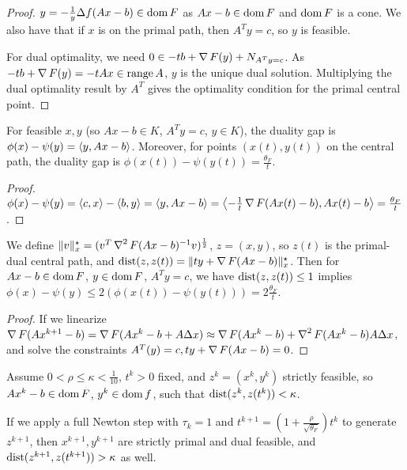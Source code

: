 \begin{proof}
  $y = -\frac{1}{y} \Delta f(Ax - b) \in \operatorname*{dom} F$ as $Ax - b \in \operatorname*{dom}
  F$ and $\operatorname*{dom} F$ is a cone.  We also have that if $x$ is on the primal path,
  then $A^{T} y = c$, so $y$ is feasible.

  For dual optimality, we need $0 \in -tb + \operatorname*{\nabla} F(y) + N_{A^{T} y =
    c}$. As $-tb + \operatorname*{\nabla} F(y) = -tAx \in \operatorname*{range} A$, $y$ is the unique
  dual solution.  Multiplying the dual optimality result by $A^{T}$
  gives the optimality condition for the primal central point.
\end{proof}

\begin{thm}
  \label{sec:inter-point-meth-4}
  For feasible $x, y$ (so $Ax - b \in K$, $A^{T}y = c$, $y \in K$),
  the duality gap is $\phi(x) - \psi(y) = \IP{y, Ax - b}$.  Moreover,
  for points $(x(t), y(t))$ on the central path, the duality gap is
  $\phi(x(t)) - \psi(y(t)) = \frac{\theta_{F}}{t}$.
\end{thm}

\begin{proof}
  $\phi(x) - \psi(y) = \IP{c, x} - \IP{b, y} = \IP{y, Ax - b} =
  \IP{-\frac{1}{t} \grad F(Ax(t) - b), Ax(t) - b} = \frac{\theta_{F}}{t}$.
\end{proof}

\begin{thm}
  \label{sec:inter-point-meth-5}
  We define $\| v \|_{x}^{\star} = (v^{T} \operatorname*{\nabla}^{2} F(Ax - b)^{-1}
  v)^{\frac{1}{2}}$, $z = (x, y)$, so $z(t)$ is the primal-dual
  central path, and $\operatorname*{dist}(z, z(t)) = \| ty + \operatorname*{\nabla} F(Ax -
  b)\|_{x}^{\star}$.
  Then for $Ax - b \in \operatorname*{dom} F$, $y \in \operatorname*{dom} F$, $A^{T}y = c$, we have
  $\operatorname*{dist}(z, z(t)) \leq 1$ implies $\phi(x) - \psi(y) \leq 2(\phi(x(t))
  - \psi(y(t))) = 2 \frac{\theta_{F}}{t}$.
\end{thm}

\begin{proof}
  If we linearize $\operatorname*{\nabla} F(Ax^{k+1} - b) = \operatorname*{\nabla} F(Ax^{k} - b + A
  \Delta x) \approx \operatorname*{\nabla} F(A x^{k} - b) + \operatorname*{\nabla}^{2} F(Ax^{k} - b) A
  \Delta x$, and solve the constraints $A^{T}(y) = c, ty + \operatorname*{\nabla} F(Ax
  - b) = 0$.
\end{proof}

\begin{thm}
  \label{sec:inter-point-meth-6}
  Assume $0 < \rho \leq \kappa < \frac{1}{10}$, $t^{k} > 0$ fixed, and
  $z^{k} = (x^{k}, y^{k})$ strictly feasible, so $Ax^{k} - b \in \operatorname*{dom}
  F$, $y^{k} \in \operatorname*{dom} f$, such that $\operatorname*{dist}(z^{k}, z(t^{k})) < \kappa$.

  If we apply a full Newton step with $\tau_{k} = 1$ and $t^{k+1} = (1
  + \frac{\rho}{\sqrt{\theta_{F}}}) t^{k}$ to generate $z^{k+1}$, then
  $x^{k+1}, y^{k+1}$ are strictly primal and dual feasible, and
  $\operatorname*{dist}(z^{k+1}, z(t^{k+1})) > \kappa$ as well.
\end{thm}


